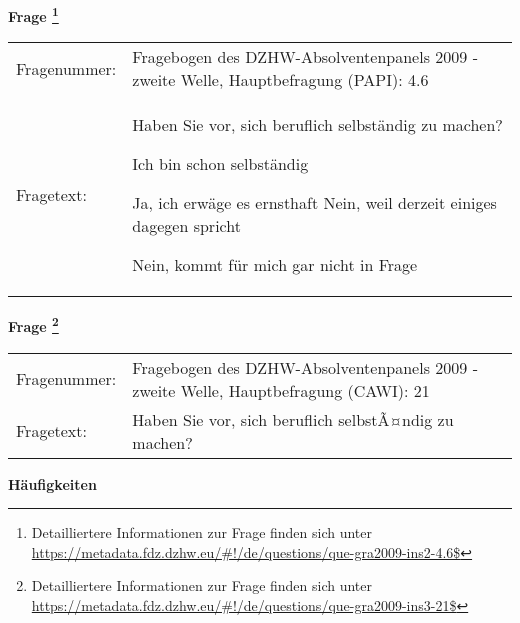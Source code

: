 				\vspace*{0.5cm}
                \noindent\textbf{Frage
	                \footnote{Detailliertere Informationen zur Frage finden sich unter
		              \url{https://metadata.fdz.dzhw.eu/\#!/de/questions/que-gra2009-ins2-4.6$}}}\\
				\begin{tabularx}{\hsize}{@{}lX}
					Fragenummer: &
					  Fragebogen des DZHW-Absolventenpanels 2009 - zweite Welle, Hauptbefragung (PAPI):
					  4.6
 \\
					Fragetext: & Haben Sie vor, sich beruflich selbständig zu machen?\par  Ich bin schon selbständig\par  Ja, ich erwäge es ernsthaft Nein, weil derzeit einiges dagegen spricht\par  Nein, kommt für mich gar nicht in Frage \\
				\end{tabularx}
				\vspace*{0.5cm}
                \noindent\textbf{Frage
	                \footnote{Detailliertere Informationen zur Frage finden sich unter
		              \url{https://metadata.fdz.dzhw.eu/\#!/de/questions/que-gra2009-ins3-21$}}}\\
				\begin{tabularx}{\hsize}{@{}lX}
					Fragenummer: &
					  Fragebogen des DZHW-Absolventenpanels 2009 - zweite Welle, Hauptbefragung (CAWI):
					  21
 \\
					Fragetext: & Haben Sie vor, sich beruflich selbstÃ¤ndig zu machen? \\
				\end{tabularx}





        		\vspace*{0.5cm}
                \noindent\textbf{Häufigkeiten}


